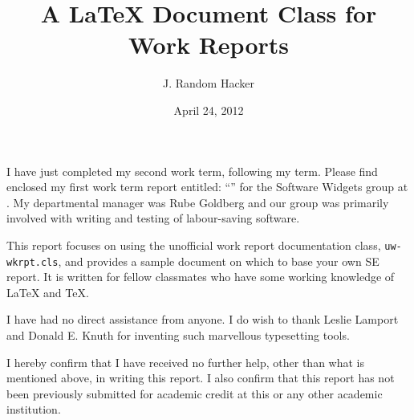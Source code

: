 \documentclass{uw-wkrpt}
\begin{document}

\title{A \LaTeX{} Document Class for Work Reports}

\author{J. Random Hacker}

\date{April 24, 2012}

\newcommand{\theuwid}{01234567}

\newcommand{\theuserid}{jrhacker}

\address{123 University Ave. W.\\*
         Waterloo, ON\ \ N2L 3G1}






\mymaketitle

\clearpage
\singlespacing

\begin{letter}
I have just completed my second work term, following my \theterm{} term.
Please find enclosed my first work term report entitled:
``\thetitle'' for the Software Widgets group at \theemployer.
My departmental manager was Rube Goldberg
and our group was primarily involved with writing and testing
of labour-saving software.

This report focuses on using the unofficial work report
documentation class, \texttt{uw-wkrpt.cls}, and provides a
sample document on which to base your own SE report.  It is written for
fellow classmates who have some working knowledge of \LaTeX{} and \TeX{}.

I have had no direct assistance from anyone.  I do wish to thank Leslie
Lamport and Donald E. Knuth for inventing such marvellous typesetting
tools.

I hereby confirm that I have received no further help, other than what is
mentioned above, in writing this report. I also confirm that this report has not
been previously submitted for academic credit at this or any other academic
institution.

\end{letter}
\end{document}
